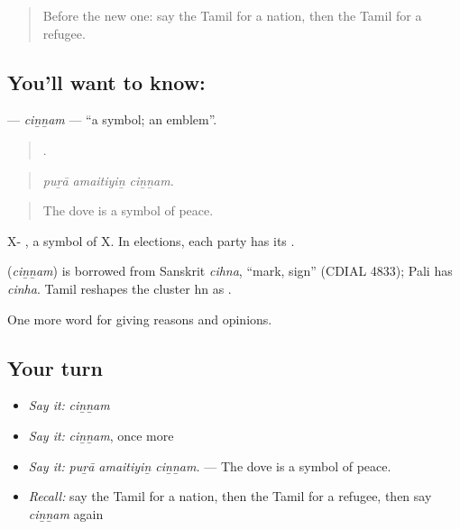 \label{lesson:TA-C381-cinnam}



\begin{quote}
Before the new one: say the Tamil for a nation, then the Tamil for a refugee.
\end{quote}

\subsection*{You'll want to know: }
\textbf{} — \emph{ciṉṉam} — \textquotedblleft{}a symbol; an emblem\textquotedblright{}.

\begin{quote}
  .
\end{quote}

\begin{quote}
\emph{puṟā amaitiyiṉ ciṉṉam.}
\end{quote}

\begin{quote}
The dove is a symbol of peace.
\end{quote}

X- , a symbol of X. In elections, each party has its .

\begin{cousinweb}
\textbf{} (\emph{ciṉṉam}) is borrowed from Sanskrit \emph{cihna}, \textquotedblleft{}mark, sign\textquotedblright{} (CDIAL 4833); Pali has \emph{cinha}. Tamil reshapes the cluster hn as .
\end{cousinweb}

\begin{grammarlens}[title={What you've built}]
One more word for giving reasons and opinions.
\end{grammarlens}

\subsection*{Your turn}
\begin{itemize}
\raggedright
  \item \emph{Say it:} \emph{ciṉṉam}
  \item \emph{Say it:} \emph{ciṉṉam}, once more
  \item \emph{Say it:} \emph{puṟā amaitiyiṉ ciṉṉam.} — The dove is a symbol of peace.
  \item \emph{Recall:} say the Tamil for a nation, then the Tamil for a refugee, then say \emph{ciṉṉam} again
\end{itemize}

